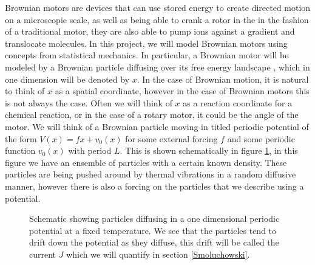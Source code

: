 \documentclass[11pt]{article} %
\begin{document}
Brownian motors are devices that can use stored energy to create directed motion on a microscopic scale, as well as being able to crank a rotor in the in the fashion of a traditional motor, they are also able to pump ions against a gradient and translocate molecules. In this project, we will model Brownian motors using concepts from statistical mechanics. In particular, a Brownian motor will be modeled by a Brownian particle diffusing over its free energy landscape \cite{Reimann2001}, which in one dimension will be denoted by $x$. In the case of Brownian motion, it is natural to think of $x$ as a spatial coordinate, however in the case of Brownian motors this is not always the case. Often we will think of $x$ as a reaction coordinate for a chemical reaction, or in the case of a rotary motor, it could be the angle of the motor. We will think of a Brownian particle moving in titled periodic potential of the form $V(x) = f x + v_0(x)$ for some external forcing $f$ and some periodic function $v_0(x)$ with period $L$. This is shown schematically in figure \ref{fig:Schematic}, in this figure we have an ensemble of  particles with a certain known density. These particles are being pushed around by thermal vibrations in a random diffusive manner, however there is also a forcing on the particles that we describe using a potential.

\begin{figure}[tb]
	\centering
\quad
\caption{Schematic showing particles diffusing in a one dimensional periodic potential at a fixed temperature. We see that the particles tend to drift down the potential as they diffuse, this drift will be called the current $J$ which we will quantify in section \ref{Smoluchowski}.}
\label{fig:Schematic} 
\end{figure}
\end{document}
